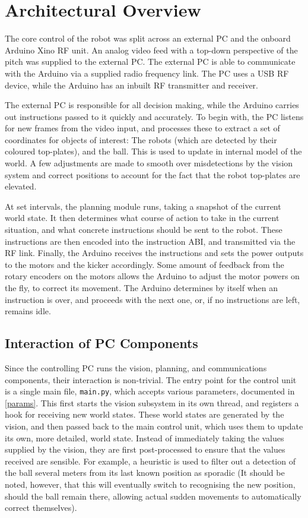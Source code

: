 \section{Architectural Overview}

The core control of the robot was split across an external PC and the onboard
Arduino Xino RF unit. An analog video feed with a top-down perspective of the
pitch was supplied to the external PC. The external PC is able to communicate
with the Arduino via a supplied radio frequency link. The PC uses a USB RF
device, while the Arduino has an inbuilt RF transmitter and receiver.

The external PC is responsible for all decision making, while the Arduino
carries out instructions passed to it quickly and accurately.
To begin with, the PC listens for new frames from the video input, and
processes these to extract a set of coordinates for objects of interest: The
robots (which are detected by their coloured top-plates), and the ball. This is
used to update in internal model of the world. A few adjustments are made to
smooth over misdetections by the vision system and correct positions to account
for the fact that the robot top-plates are elevated.

At set intervals, the planning module runs, taking a snapshot of the current
world state. It then determines what course of action to take in the current
situation, and what concrete instructions should be sent to the robot. These
instructions are then encoded into the instruction ABI, and transmitted via the
RF link. Finally, the Arduino receives the instructions and sets the power
outputs to the motors and the kicker accordingly. Some amount of feedback from
the rotary encoders on the motors allows the Arduino to adjust the motor powers
on the fly, to correct its movement. The Arduino determines by itself when an
instruction is over, and proceeds with the next one, or, if no instructions are
left, remains idle.

\subsection{Interaction of PC Components}

Since the controlling PC runs the vision, planning, and communications
components, their interaction is non-trivial. The entry point for the control
unit is a single main file, \texttt{main.py}, which accepts various parameters,
documented in \cref{params}. This first starts the vision subsystem in its own
thread, and registers a hook for receiving new world states. These world states
are generated by the vision, and then passed back to the main control unit,
which uses them to update its own, more detailed, world state. Instead of
immediately taking the values supplied by the vision, they are first
post-processed to ensure that the values received are sensible. For example, a
heuristic is used to filter out a detection of the ball several meters from its
last known position as sporadic (It should be noted, however, that this will
eventually switch to recognising the new position, should the ball remain
there, allowing actual sudden movements to automatically correct themselves).

